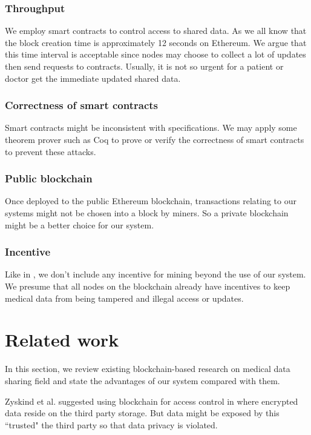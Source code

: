 \documentclass[conference]{IEEEtran}
\begin{document}
\subsubsection{Throughput}
We employ smart contracts to control access to shared data. As we all know that the block creation time is approximately 12 seconds on Ethereum. We argue that this time interval is acceptable since nodes may choose to collect a lot of updates then send requests to contracts. Usually, it is not so urgent for a patient or doctor get the immediate updated shared data.

\subsubsection{Correctness of smart contracts }
Smart contracts might be inconsistent with specifications. We may apply some theorem prover such as Coq\cite{huet2004coq} to prove or verify the correctness of smart contracts to prevent these attacks.

\subsubsection{Public blockchain}
Once deployed to the public Ethereum blockchain, transactions relating to our systems might not be chosen into a block by miners. So a private blockchain might be a better choice for our system.

\subsubsection{Incentive}
Like in \cite{dagher2018ancile}, we don't include any incentive for mining beyond the use of our system. We presume that all nodes on the blockchain already have incentives to keep medical data from being tampered and illegal access or updates.

\section{Related work}
\label{related work}
In this section, we review existing blockchain-based research on medical data sharing field and state the advantages of our system compared with them.

Zyskind et al. suggested using blockchain for access control in \cite{zyskind2015decentralizing} where encrypted data reside on the third party storage. But data might be exposed by this ``trusted" the third party so that data privacy is violated.
\end{document}

